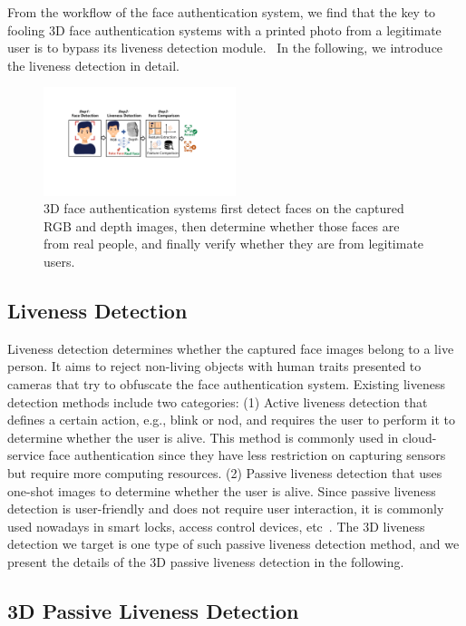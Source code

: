 From the workflow of the face authentication system, we find that the key to fooling 3D face authentication systems with a printed photo from a legitimate user is to bypass its liveness detection module.  In the following, we introduce the liveness detection in detail.

\begin{figure}[pt]
	\centerline{\includegraphics[width = 0.5\textwidth]{figures/face_auth_workflow.pdf}}
	\vspace{-0.15in}
	\caption{3D face authentication systems first detect faces on the captured RGB and depth images, then determine whether those faces are from real people, and finally verify whether they are from legitimate users. }
	\label{fas_workflow}
	\vspace{-0.15in}
\end{figure}

\subsection{Liveness Detection}
Liveness detection  determines
whether the captured face images belong to a live person. It aims to reject non-living objects with human traits presented to cameras that try to obfuscate the face authentication system. 
Existing liveness detection methods include two categories: (1) Active liveness detection that defines a certain action, e.g., blink or nod, and requires the user to perform it to determine whether the user is alive. This method is commonly used in cloud-service face authentication since they have less restriction on capturing sensors but require more computing resources. (2) Passive liveness detection that uses one-shot images to determine whether the user is alive. 
Since passive liveness detection is user-friendly and does not require user interaction, it is commonly used nowadays in smart locks, access control devices, etc~\cite{chakraborty2014overview}.  The 3D liveness detection we target is one type of such passive liveness detection method,  and we present the details of the 3D passive liveness detection in the following. 

\subsection{3D Passive Liveness Detection}

